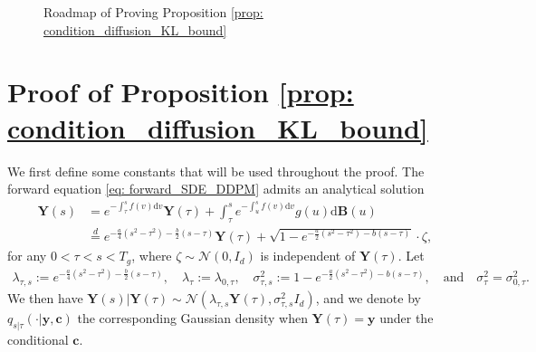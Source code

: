 \documentclass[11pt]{article}
\newcommand{\bY}{\mathbf{Y}}
\newcommand{\by}{\mathbf{y}}
\newcommand{\bc}{\mathbf{c}}
\newcommand{\bB}{\mathbf{B}}
\newcommand{\intd}{\mathrm{d}}
\begin{document}
\begin{figure}[htp]
\caption{Roadmap of Proving Proposition \ref{prop: condition_diffusion_KL_bound}}
\label{fig:placeholder}
\end{figure}

\section{Proof of Proposition \ref{prop: condition_diffusion_KL_bound}}\label{sec: convergence_proof}


We first define some constants that will be used throughout the proof. The forward equation \eqref{eq: forward_SDE_DDPM}  admits an analytical solution
\begin{align}
    \bY(s) &= e^{-\int_\tau^sf(v)\intd v}\bY(\tau) + \int_{\tau}^s e^{-\int_u^sf(v)\intd v}g(u) \intd \bB(u) \nonumber \\
    & \overset{d}{=}  e^{-\frac{a}{4}(s^2 - \tau^2) - \frac{b}{2}(s - \tau)}\bY(\tau) + \sqrt{1 - e^{-\frac{a}{2}(s^2 - \tau^2) - b(s - \tau)}}\cdot\zeta, \label{eq: DDPM_conditional_relation}
\end{align}
for any $0 < \tau < s < T_g$, where $\zeta\sim\mathcal{N}(0, I_d)$ is independent of $\bY(\tau)$. Let
\begin{align}\label{eq: forward_SDE_coeff}
    \lambda_{\tau, s} := e^{-\frac{a}{4}(s^2 - \tau^2) - \frac{b}{2}(s - \tau)}, \quad \lambda_\tau:= \lambda_{0,\tau}, \quad \sigma^2_{\tau, s} := 1 - e^{-\frac{a}{2}(s^2 - \tau^2) - b(s - \tau)},\quad \text{and}  \quad  \sigma_{\tau}^2 = \sigma^2_{0,\tau}.
\end{align}
 We then have $\bY(s) | \bY(\tau) \sim \mathcal{N}(\lambda_{\tau, s}\bY(\tau), \sigma^2_{\tau, s}I_d)$, and we denote by $q_{s|\tau}(\cdot | \by, \bc)$ the corresponding Gaussian density when $\bY(\tau) = \by$ under the conditional $\bc$.
\end{document}
